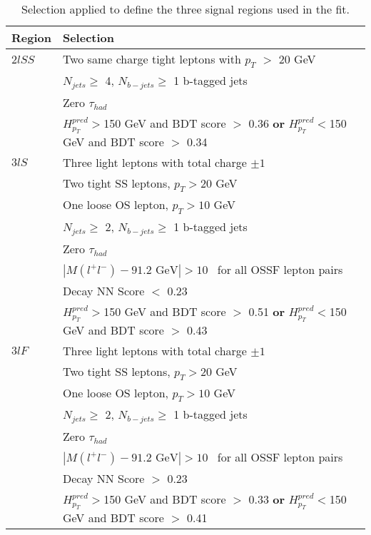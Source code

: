 \begin{table}[H]
  \begin{center}
  \begin{tabular}{ll}
  \hline\hline
  Region & Selection \\
  \hline
  $2lSS$ & Two same charge tight leptons with $p_T$ $>$ 20 GeV \\
  & $N_{jets}\geq$ 4, $N_{b-jets}\geq$ 1 b-tagged jets \\
  & Zero $\tau_{had}$\\
  & $H^{pred}_{p_T}>$150 GeV and BDT score $>$ 0.36 \textbf{or} $H^{pred}_{p_T}<$150 GeV and BDT score $>$ 0.34 \\
  \hline
  $3lS$ & Three light leptons with total charge $\pm 1$ \\
  & Two tight SS leptons, $p_T > 20$ GeV \\
  & One loose OS lepton, $p_T > 10$ GeV \\
  & $N_{jets}\geq$ 2, $N_{b-jets}\geq$ 1 b-tagged jets \\
  & Zero $\tau_{had}$ \\           
  & $|M(l^+l^-)-91.2\textrm{ GeV}| > 10$~\GeV{} for all OSSF lepton pairs \\
  & Decay NN Score $<$ 0.23 \\
  & $H^{pred}_{p_T}>$150 GeV and BDT score $>$ 0.51 \textbf{or} $H^{pred}_{p_T}<$150 GeV and BDT score $>$ 0.43 \\
  \hline
  $3lF$ & Three light leptons with total charge $\pm 1$ \\
  & Two tight SS leptons, $p_T > 20$ GeV \\                                                                                  
  & One loose OS lepton, $p_T > 10$ GeV \\                                                                                   
  & $N_{jets}\geq$ 2, $N_{b-jets}\geq$ 1 b-tagged jets \\
  & Zero $\tau_{had}$ \\
  & $|M(l^+l^-)-91.2\textrm{ GeV}| > 10$~\GeV{} for all OSSF lepton pairs \\                                                 
  & Decay NN Score $>$ 0.23 \\
  & $H^{pred}_{p_T}>$150 GeV and BDT score $>$ 0.33 \textbf{or} $H^{pred}_{p_T}<$150 GeV and BDT score $>$ 0.41 \\
  \hline\hline
  \end{tabular}
  \end{center}
  \caption{Selection applied to define the three signal regions used in the fit.}
  \label{tab:sigRegionCuts}
\end{table}

